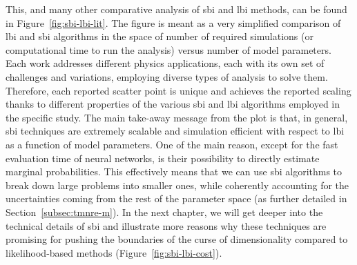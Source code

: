 This, and many other comparative analysis of \gls*{sbi} and \gls*{lbi} methods, can be found in Figure~\ref{fig:sbi-lbi-lit}. The figure is meant as a very simplified comparison of \gls*{lbi} and \gls*{sbi} algorithms in the space of number of required simulations (or computational time to run the analysis) versus number of model parameters. Each work addresses different physics applications, each with its own set of challenges and variations, employing diverse types of analysis to solve them. Therefore, each reported scatter point is unique and achieves the reported scaling thanks to different properties of the various \gls*{sbi} and \gls*{lbi} algorithms employed in the specific study. The main take-away message from the plot is that, in general, \gls*{sbi} techniques are extremely scalable and simulation efficient with respect to \gls*{lbi} as a function of model parameters. One of the main reason, except for the fast evaluation time of neural networks, is their possibility to directly estimate marginal probabilities. This effectively means that we can use \gls*{sbi} algorithms to break down large problems into smaller ones, while coherently accounting for the uncertainties coming from the rest of the parameter space (as further detailed in Section~\ref{subsec:tmnre-m}). In the next chapter, we will get deeper into the technical details of \gls*{sbi} and illustrate more reasons why these techniques are promising for pushing the boundaries of the curse of dimensionality compared to likelihood-based methods (Figure~\ref{fig:sbi-lbi-cost}).


